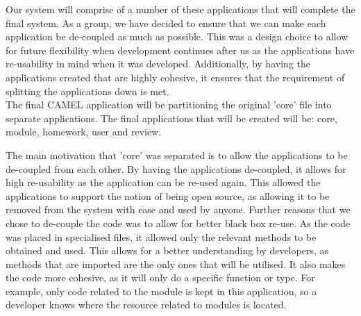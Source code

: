 		Our system will comprise of a number of these applications that will complete the final system. As a group, we have decided to ensure that we can make each application be de-coupled as much as possible. This was a design choice to allow for future flexibility when development continues after us as the applications have re-usability in mind when it was developed. Additionally, by having the applications created that are highly cohesive, it ensures that the requirement of splitting the applications down is met.\\
		
		The final CAMEL application will be partitioning the original 'core' file into separate applications. The final applications that will be created will be: core, module, homework, user and review.\\ \label{softwarearchitectureFinalApplications}
		
		The main motivation that 'core' was separated is to allow the applications to be de-coupled from each other. By having the applications de-coupled, it allows for high re-usability as the application can be re-used again. This allowed the applications to support the notion of being open source, as allowing it to be removed from the system with ease and used by anyone. Further reasons that we chose to de-couple the code was to allow for better black box re-use. As the code was placed in specialised files, it allowed only the relevant methods to be obtained and used. This allows for a better understanding by developers, as methods that are imported are the only ones that will be utilised. It also makes the code more cohesive, as it will only do a specific function or type. For example, only code related to the module is kept in this application, so a developer knows where the resource related to modules is located.\\   